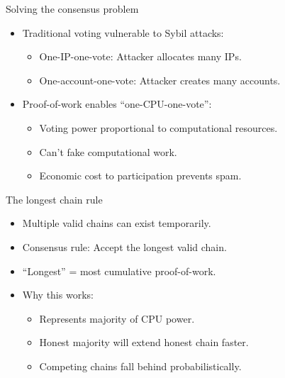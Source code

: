 \documentclass[aspectratio=169, lualatex, handout]{beamer}
\begin{document}
\begin{frame}{Solving the consensus problem}
	\begin{itemize}
		\item Traditional voting vulnerable to Sybil attacks:
		      \begin{itemize}
			      \item One-IP-one-vote: Attacker allocates many IPs.
			      \item One-account-one-vote: Attacker creates many accounts.
		      \end{itemize}
		\item Proof-of-work enables ``one-CPU-one-vote'':
		      \begin{itemize}
			      \item Voting power proportional to computational resources.
			      \item Can't fake computational work.
			      \item Economic cost to participation prevents spam.
		      \end{itemize}
	\end{itemize}
\end{frame}

\begin{frame}{The longest chain rule}
	\begin{itemize}
		\item Multiple valid chains can exist temporarily.
		\item Consensus rule: Accept the longest valid chain.
		\item ``Longest'' = most cumulative proof-of-work.
		\item Why this works:
		      \begin{itemize}
			      \item Represents majority of CPU power.
			      \item Honest majority will extend honest chain faster.
			      \item Competing chains fall behind probabilistically.
		      \end{itemize}
	\end{itemize}
\end{frame}
\end{document}
